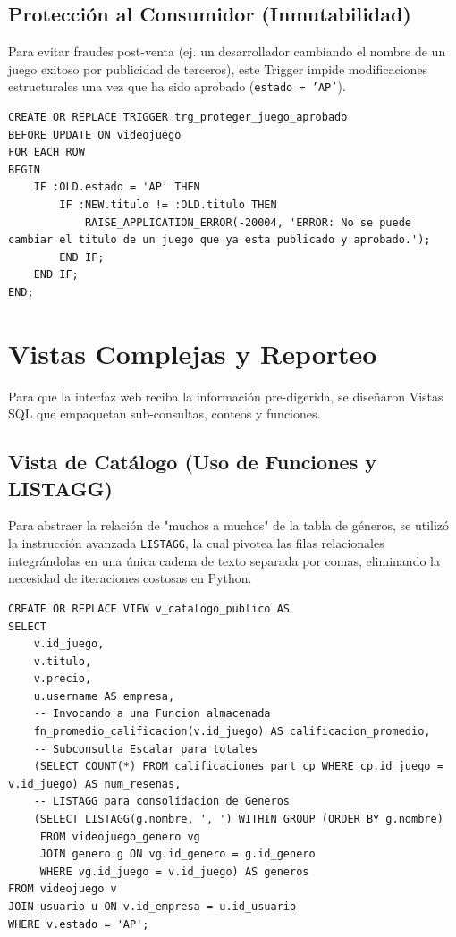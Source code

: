 \documentclass[12pt,a4paper]{article}
\begin{document}
\subsection{Protección al Consumidor (Inmutabilidad)}
Para evitar fraudes post-venta (ej. un desarrollador cambiando el nombre de un juego exitoso por publicidad de terceros), este Trigger impide modificaciones estructurales una vez que ha sido aprobado (\texttt{estado = 'AP'}).
\begin{lstlisting}
CREATE OR REPLACE TRIGGER trg_proteger_juego_aprobado
BEFORE UPDATE ON videojuego
FOR EACH ROW
BEGIN
    IF :OLD.estado = 'AP' THEN
        IF :NEW.titulo != :OLD.titulo THEN
            RAISE_APPLICATION_ERROR(-20004, 'ERROR: No se puede cambiar el titulo de un juego que ya esta publicado y aprobado.');
        END IF;
    END IF;
END;
\end{lstlisting}

\section{Vistas Complejas y Reporteo}
Para que la interfaz web reciba la información pre-digerida, se diseñaron Vistas SQL que empaquetan sub-consultas, conteos y funciones.

\subsection{Vista de Catálogo (Uso de Funciones y LISTAGG)}
Para abstraer la relación de "muchos a muchos" de la tabla de géneros, se utilizó la instrucción avanzada \texttt{LISTAGG}, la cual pivotea las filas relacionales integrándolas en una única cadena de texto separada por comas, eliminando la necesidad de iteraciones costosas en Python.

\begin{lstlisting}
CREATE OR REPLACE VIEW v_catalogo_publico AS
SELECT 
    v.id_juego,
    v.titulo,
    v.precio,
    u.username AS empresa,
    -- Invocando a una Funcion almacenada
    fn_promedio_calificacion(v.id_juego) AS calificacion_promedio,
    -- Subconsulta Escalar para totales
    (SELECT COUNT(*) FROM calificaciones_part cp WHERE cp.id_juego = v.id_juego) AS num_resenas,
    -- LISTAGG para consolidacion de Generos
    (SELECT LISTAGG(g.nombre, ', ') WITHIN GROUP (ORDER BY g.nombre)
     FROM videojuego_genero vg
     JOIN genero g ON vg.id_genero = g.id_genero
     WHERE vg.id_juego = v.id_juego) AS generos
FROM videojuego v
JOIN usuario u ON v.id_empresa = u.id_usuario
WHERE v.estado = 'AP';
\end{lstlisting}
\end{document}
